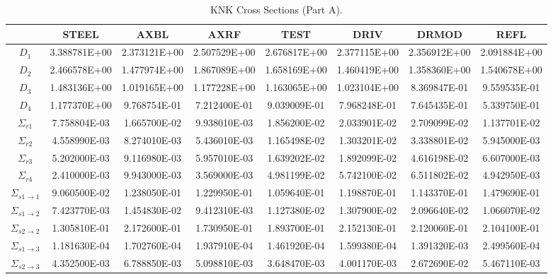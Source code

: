     \thispagestyle{lscapedplain}
    \begin{landscape}
    \begin{table}
      \caption{KNK Cross Sections (Part A).}
      \label{tab:knkxs_a}
      \begin{center}
        \begin{tabular}{cccccccc}
          \toprule
          &STEEL&AXBL&AXRF&TEST&DRIV&DRMOD&REFL\\
          \midrule
          $D_1$&3.388781E+00&2.373121E+00&2.507529E+00&2.676817E+00&2.377115E+00&2.356912E+00&2.091884E+00\\
          $D_2$&2.466578E+00&1.477974E+00&1.867089E+00&1.658169E+00&1.460419E+00&1.358360E+00&1.540678E+00\\
          $D_3$&1.483136E+00&1.019165E+00&1.177228E+00&1.163065E+00&1.023104E+00&8.369847E-01&9.559535E-01\\
          $D_4$&1.177370E+00&9.768754E-01&7.212400E-01&9.039009E-01&7.968248E-01&7.645435E-01&5.339750E-01\\
          $\Sigma_{r1}$&7.758804E-03&1.665700E-02&9.938010E-03&1.856200E-02&2.033901E-02&2.709099E-02&1.137701E-02\\
          $\Sigma_{r2}$&4.558990E-03&8.274010E-03&5.436010E-03&1.165498E-02&1.303201E-02&3.338801E-02&5.945000E-03\\
          $\Sigma_{r3}$&5.202000E-03&9.116980E-03&5.957010E-03&1.639202E-02&1.892099E-02&4.616198E-02&6.607000E-03\\
          $\Sigma_{r4}$&2.410000E-03&9.943000E-03&3.569000E-03&4.981199E-02&5.742100E-02&6.511802E-02&4.942950E-03\\
          $\Sigma_{s 1\rightarrow 1}$&9.060500E-02&1.238050E-01&1.229950E-01&1.059640E-01&1.198870E-01&1.143370E-01&1.479690E-01\\
          $\Sigma_{s 1\rightarrow 2}$&7.423770E-03&1.454830E-02&9.412310E-03&1.127380E-02&1.307900E-02&2.096640E-02&1.066070E-02\\
          $\Sigma_{s 2\rightarrow 2}$&1.305810E-01&2.172600E-01&1.730950E-01&1.893700E-01&2.152130E-01&2.120060E-01&2.104100E-01\\
          $\Sigma_{s 1\rightarrow 3}$&1.181630E-04&1.702760E-04&1.937910E-04&1.461920E-04&1.599380E-04&1.391320E-03&2.499560E-04\\
          $\Sigma_{s 2\rightarrow 3}$&4.352500E-03&6.788850E-03&5.098810E-03&3.648470E-03&4.001170E-03&2.672690E-02&5.467110E-03\\

\end{tabular}
\end{center}
\end{table}
\end{landscape}
